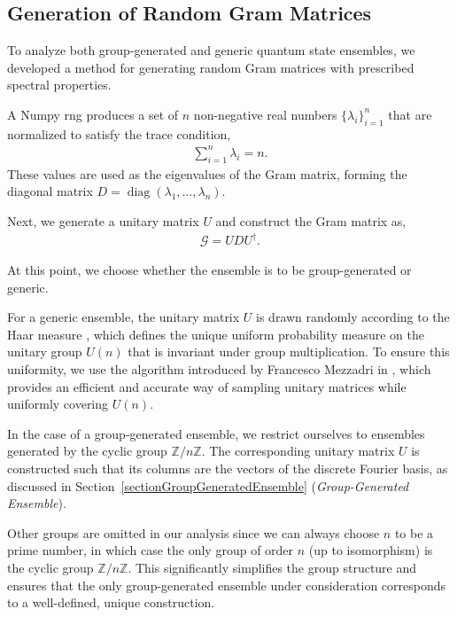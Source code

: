 \documentclass[12pt,letterpaper]{article}
\begin{document}
\begin{multicols}{2}
\subsection{Generation of Random Gram Matrices}

To analyze both group-generated and generic quantum state ensembles, we developed a method for generating random Gram matrices with prescribed spectral properties.

A Numpy \gls{rng} produces a set of $n$ non-negative real numbers $\{\lambda_i\}_{i=1}^n$ that are normalized to satisfy the trace condition,
\begin{align*}
	\sum_{i=1}^n \lambda_i = n.
\end{align*}
These values are used as the eigenvalues of the Gram matrix, forming the diagonal matrix $D = \operatorname{diag}(\lambda_1, \dots, \lambda_n)$. 

Next, we generate a unitary matrix $U$ and construct the Gram matrix as,
\begin{align*}
	\mathcal{G} = U D U^\dagger.
\end{align*}

At this point, we choose whether the ensemble is to be group-generated or generic.

For a generic ensemble, the unitary matrix $U$ is drawn randomly according to the Haar measure \cite{haarMeasure}, which defines the unique uniform probability measure on the unitary group $U(n)$ that is invariant under group multiplication. To ensure this uniformity, we use the algorithm introduced by Francesco Mezzadri in \cite{UnitaryMatricesGeneration}, which provides an efficient and accurate way of sampling unitary matrices while uniformly covering $U(n)$.

In the case of a group-generated ensemble, we restrict ourselves to ensembles generated by the cyclic group $\mathbb{Z}/n\mathbb{Z}$. The corresponding unitary matrix $U$ is constructed such that its columns are the vectors of the discrete Fourier basis, as discussed in Section~\ref{sectionGroupGeneratedEnsemble} (\emph{Group-Generated Ensemble}).

Other groups are omitted in our analysis since we can always choose $n$ to be a prime number, in which case the only group of order $n$ (up to isomorphism) is the cyclic group $\mathbb{Z}/n\mathbb{Z}$. This significantly simplifies the group structure and ensures that the only group-generated ensemble under consideration corresponds to a well-defined, unique construction.


\end{multicols}
\end{document}
